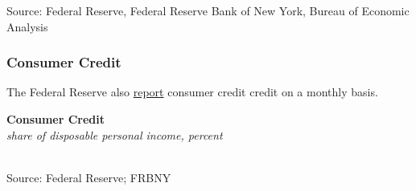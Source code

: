 \documentclass{report}
\makeatletter
\newcommand{\tbllink}[1]{\href{https://raw.githubusercontent.com/bdecon/US-chartbook/master/chartbook/data/#1}{\faTable}}
\newcommand*\short[1]{\expandafter\@gobbletwo\number\numexpr#1\relax}
\newcommand{\stdnode}[3]{\node[below, align=left, shift=({#1,#2})]{#3};}
\newcommand{\dateaxisticks}{
		date coordinates in=x, axis line style={draw=none},
		xmax={2021-05-15},
		max space between ticks=40,	    
		xtick={{1990-01-01}, {1992-01-01}, {1994-01-01}, 
			{1996-01-01}, {1998-01-01}, {2000-01-01}, 
			{2002-01-01}, {2004-01-01}, {2006-01-01},
			{2008-01-01}, {2010-01-01}, {2012-01-01}, {2014-01-01},
		    {2016-01-01}, {2018-01-01}, {2020-01-01}},
		minor xtick={{1989-01-01}, {1991-01-01}, {1993-01-01},
			{1995-01-01}, {1997-01-01}, {1999-01-01}, 
			{2001-01-01}, {2003-01-01}, {2005-01-01}, {2007-01-01},
		    {2009-01-01}, {2011-01-01}, {2013-01-01}, {2015-01-01},
		    {2017-01-01}, {2019-01-01}, {2021-01-01}},
		enlarge y limits={0.06}, enlarge x limits={0.01},
		}
\newcommand{\bbar}[2]{extra #1 ticks = {{#2}}, extra #1 tick labels = ,
		extra #1 tick style = {grid=major, grid style={thick, black!25}},}
\newcommand{\thinline}[4]{\addplot[no markers, color=#1] 
		table [x=#2, y=#3, col sep=comma] {#4};	}
\newcommand{\thickline}[4]{\addplot[ultra thick, no markers, color=#1] 
		table [x=#2, y=#3, col sep=comma] {#4};	}
\newcommand{\rbars}{
		\fill[color=black!10] (axis cs:{1990-07-01},\pgfkeysvalueof{/pgfplots/ymin}) rectangle 
			(axis cs:{1991-03-01}, \pgfkeysvalueof{/pgfplots/ymax});
		\fill[color=black!10] (axis cs:{2007-12-01},\pgfkeysvalueof{/pgfplots/ymin}) rectangle 
			(axis cs:{2009-07-01}, \pgfkeysvalueof{/pgfplots/ymax});
		\fill[color=black!10] (axis cs:{2001-03-01},\pgfkeysvalueof{/pgfplots/ymin}) rectangle 
			(axis cs:{2001-11-01}, \pgfkeysvalueof{/pgfplots/ymax});
		\fill[color=black!10] (axis cs:{2020-02-01},\pgfkeysvalueof{/pgfplots/ymin}) rectangle 
			(axis cs:{2021-05-15}, \pgfkeysvalueof{/pgfplots/ymax});}
\makeatother
\begin{document}
{\begin{minipage}{0.76\textwidth}
\footnotesize{Source: Federal Reserve, Federal Reserve Bank of New York, Bureau of Economic Analysis}
\end{minipage}
\newpage
\begin{minipage}{0.76\textwidth}
\subsubsection*{\color{black!70} \seriffont Consumer Credit}

\small The Federal Reserve also \href{https://www.federalreserve.gov/releases/g19/current/default.htm}{report} consumer credit credit on a monthly basis. 


\vspace{1mm}

\normalsize \textbf{Consumer Credit}\\
\footnotesize{\textit{share of disposable personal income, percent}}\\
\hspace*{-2mm} \\
\footnotesize{Source: Federal Reserve; FRBNY} \hfill \tbllink{cc_dpi_monthly.csv}
\end{minipage}
\vspace{3mm}

}
\end{document}
